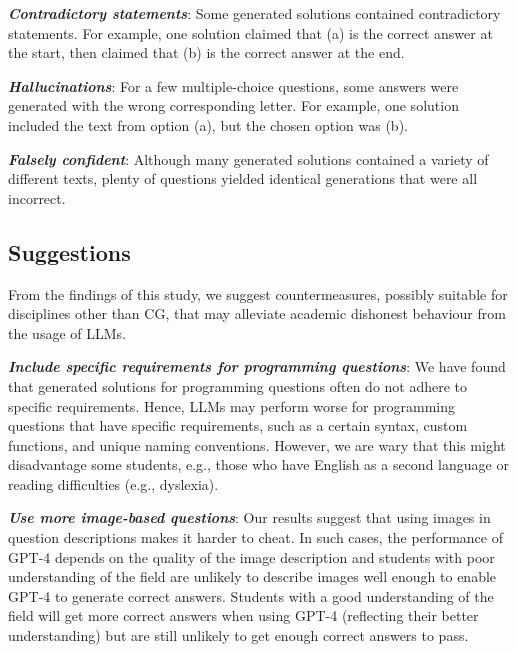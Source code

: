 \documentclass[sigconf,review]{acmart}
\begin{document}
\noindent \textit{\textbf{Contradictory statements}}: Some generated solutions contained contradictory statements. For example, one solution claimed that (a) is the correct answer at the start, then claimed that (b) is the correct answer at the end.

\noindent \textit{\textbf{Hallucinations}}: For a few multiple-choice questions, some answers were generated with the wrong corresponding letter. For example, one solution included the text from option (a), but the chosen option was (b).

\noindent \textit{\textbf{Falsely confident}}: Although many generated solutions contained a variety of different texts, plenty of questions yielded identical generations that were all incorrect.

\subsection{Suggestions}
From the findings of this study, we suggest countermeasures, possibly suitable for disciplines other than CG, that may alleviate academic dishonest behaviour from the usage of LLMs.

\noindent \textit{\textbf{Include specific requirements for programming questions}}: We have found that generated solutions for programming questions often do not adhere to specific requirements. Hence, LLMs may perform worse for programming questions that have specific requirements, such as a certain syntax, custom functions, and unique naming conventions. However, we are wary that this might disadvantage some students, e.g., those who have English as a second language or reading difficulties (e.g., dyslexia).

\noindent \textit{\textbf{Use more image-based questions}}: Our results suggest that using images in question descriptions makes it harder to cheat. In such cases, the performance of GPT-4 depends on the quality of the image description and students with poor understanding of the field are unlikely to describe images well enough to enable GPT-4 to generate correct answers.
Students with a good understanding of the field will get more correct answers when using GPT-4 (reflecting their better understanding) but are still unlikely to get enough correct answers to pass.
\end{document}
